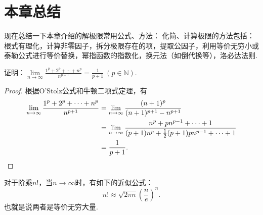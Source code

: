 \section{本章总结}
现在总结一下本章介绍的解极限常用公式、方法：
化简、计算极限的方法包括：根式有理化，计算非零因子，拆分极限存在的项，提取公因子，利用等价无穷小或泰勒公式进行等价替换，幂指函数的指数化，换元法（如倒代换等），洛必达法则.

\begin{example}\label{example:极限.解极限常用公式方法.例1}
证明：\(\lim\limits_{n\to\infty} \frac{1^p+2^p+\dotsb+n^p}{n^{p+1}} = \frac{1}{p+1}\ (p\in\mathbb{N})\).
\begin{proof}
根据O'Stolz公式和牛顿二项式定理，有\begin{align*}
\lim\limits_{n\to\infty} \frac{1^p+2^p+\dotsb+n^p}{n^{p+1}}
&= \lim\limits_{n\to\infty} \frac{(n+1)^p}{(n+1)^{p+1} - n^{p+1}} \\
&= \lim\limits_{n\to\infty} \frac{n^p + p n^{p-1} + \dotsb + 1}{(p+1) n^p + \frac{1}{2} (p+1) p n^{p-1} + \dotsb + 1} \\
&= \frac{1}{p+1}.
\qedhere
\end{align*}
\end{proof}
\end{example}

\begin{theorem}[斯特林公式]\label{theorem:极限.斯特林公式}
对于阶乘\(n!\)，当\(n\to\infty\)时，有如下的近似公式：\[
n! \approx \sqrt{2 \pi n} \left( \frac{n}{e} \right)^n.
\]也就是说两者是等价无穷大量.
\end{theorem}
